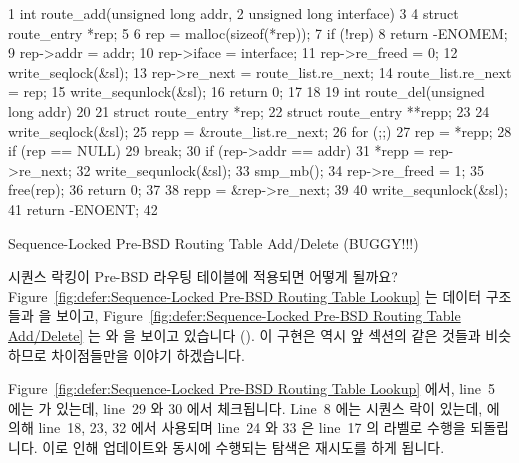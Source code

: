 \begin{listing}[tbp]
{ \scriptsize
\begin{verbbox}
 1 int route_add(unsigned long addr,
 2               unsigned long interface)
 3 {
 4   struct route_entry *rep;
 5
 6   rep = malloc(sizeof(*rep));
 7   if (!rep)
 8     return -ENOMEM;
 9   rep->addr = addr;
10   rep->iface = interface;
11   rep->re_freed = 0;
12   write_seqlock(&sl);
13   rep->re_next = route_list.re_next;
14   route_list.re_next = rep;
15   write_sequnlock(&sl);
16   return 0;
17 }
18
19 int route_del(unsigned long addr)
20 {
21   struct route_entry *rep;
22   struct route_entry **repp;
23
24   write_seqlock(&sl);
25   repp = &route_list.re_next;
26   for (;;) {
27     rep = *repp;
28     if (rep == NULL)
29       break;
30     if (rep->addr == addr) {
31       *repp = rep->re_next;
32       write_sequnlock(&sl);
33       smp_mb();
34       rep->re_freed = 1;
35       free(rep);
36       return 0;
37     }
38     repp = &rep->re_next;
39   }
40   write_sequnlock(&sl);
41   return -ENOENT;
42 }
\end{verbbox}
}
\centering
\theverbbox
\caption{Sequence-Locked Pre-BSD Routing Table Add/Delete (BUGGY!!!)}
\label{lst:defer:Sequence-Locked Pre-BSD Routing Table Add/Delete}
\end{listing}

시퀀스 락킹이 Pre-BSD 라우팅 테이블에 적용되면 어떻게 될까요?
Figure~\ref{fig:defer:Sequence-Locked Pre-BSD Routing Table Lookup}
는 데이터 구조들과  을 보이고, 
Figure~\ref{fig:defer:Sequence-Locked Pre-BSD Routing Table Add/Delete}
는  와  을 보이고 있습니다
().
이 구현은 역시 앞 섹션의 같은 것들과 비슷하므로 차이점들만을 이야기 하겠습니다.

Figure~\ref{fig:defer:Sequence-Locked Pre-BSD Routing Table Lookup} 에서,
line~5 에는  가 있는데, line~29 와 30 에서 체크됩니다.
Line~8 에는 시퀀스 락이 있는데,  에 의해 line~18, 23, 32
에서 사용되며 line~24 와 33 은 line~17 의  라벨로 수행을 되돌립니다.
이로 인해 업데이트와 동시에 수행되는 탐색은 재시도를 하게 됩니다.
\iffalse

